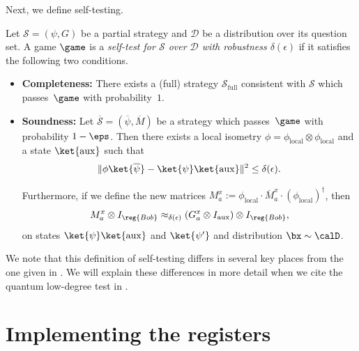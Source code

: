 Next, we define self-testing.

\begin{definition}
Let $\mathcal{S} = (\psi, G)$ be a partial strategy and $\mathcal{D}$ be a distribution over its question set.
A game $\game$ is a \emph{self-test for $\mathcal{S}$ over $\mathcal{D}$ with robustness $\delta(\epsilon)$}
if it satisfies the following two conditions.
\begin{itemize}
\itemsep -.5pt
\item[$\circ$] \textbf{Completeness:} There exists a (full) strategy $\mathcal{S}_{\mathrm{full}}$ consistent with $\mathcal{S}$ which passes~$\game$ with probability~$1$.
\item[$\circ$] \textbf{Soundness:} Let $\overline{\mathcal{S}} = (\overline{\psi}, \overline{M})$ be a strategy which passes~$\game$ with probability $1-\eps$.
	Then there exists a local isometry $\phi = \phi_{\mathrm{local}} \otimes \phi_{\mathrm{local}}$ and a state $\ket{\mathrm{aux}}$ such that
	\begin{equation*}
		\Vert \phi \ket{\overline{\psi}} - \ket{\psi}\ket{\mathrm{aux}} \Vert^2 \leq \delta(\epsilon).
	\end{equation*}
	Furthermore, if we define the new matrices $M_a^x := \phi_{\mathrm{local}} \cdot \overline{M}_a^x \cdot (\phi_{\mathrm{local}})^\dagger$, then
	\begin{equation}\label{eq:cite-once-then-never-again}
	M_a^x \otimes I_{\reg{Bob}} \approx_{\delta(\epsilon)} (G_a^x \otimes I_{\mathrm{aux}}) \otimes I_{\reg{Bob}},
	\end{equation}
	on states $\ket{\psi}\ket{\mathrm{aux}}$ and $\ket{\psi'}$ and distribution $\bx \sim \calD$.
\end{itemize}
\end{definition}

We note that this definition of self-testing differs in several key places from the one given in \cite[Definition~$2.5$]{NV18a}.
We will explain these differences in more detail when we cite the quantum low-degree test in .


\part{Implementing the registers}

\label{part:stack}


